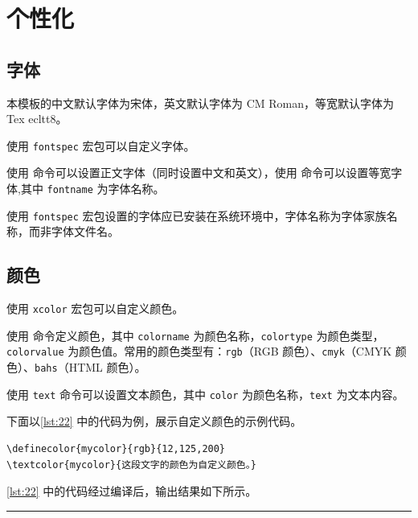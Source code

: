 \documentclass[a4paper]{article}
\begin{document}
\section{个性化}

\subsection{字体}

本模板的中文默认字体为宋体，英文默认字体为 CM Roman，等宽默认字体为 Tex ecltt8。

使用 \texttt{fontspec} 宏包可以自定义字体。

使用 \texttt{\setmainfont{fontname}} 命令可以设置正文字体（同时设置中文和英文），使用 \texttt{\setmonofont{fontname}} 命令可以设置等宽字体,其中 \texttt{fontname} 为字体名称。

使用 \texttt{fontspec} 宏包设置的字体应已安装在系统环境中，字体名称为字体家族名称，而非字体文件名。

\subsection{颜色}

使用 \texttt{xcolor} 宏包可以自定义颜色。

使用 \texttt{} 命令定义颜色，其中 \texttt{colorname} 为颜色名称，\texttt{colortype} 为颜色类型，\texttt{colorvalue} 为颜色值。常用的颜色类型有：\texttt{rgb}（RGB 颜色）、\texttt{cmyk}（CMYK 颜色）、\texttt{bahs}（HTML 颜色）。

使用 \texttt{\textcolor{color}{text}} 命令可以设置文本颜色，其中 \texttt{color} 为颜色名称，\texttt{text} 为文本内容。

下面以\cref{lst:22} 中的代码为例，展示自定义颜色的示例代码。

\begin{center}
    \label{lst:22}
    \begin{verbatim}
\definecolor{mycolor}{rgb}{12,125,200}
\textcolor{mycolor}{这段文字的颜色为自定义颜色。}
    \end{verbatim}
\end{center}

\cref{lst:22} 中的代码经过编译后，输出结果如下所示。

\vspace{0.75cm}
\hrule
\vspace{0.25cm}
\end{document}
